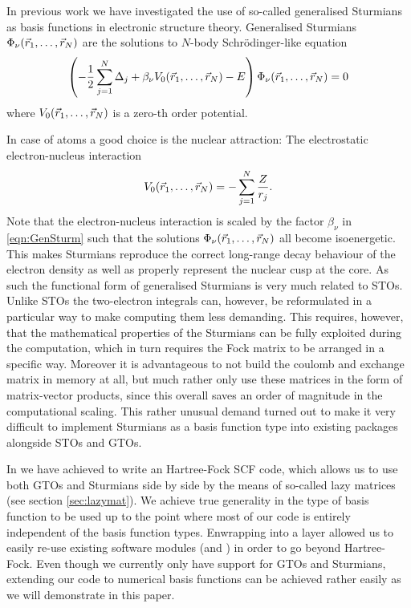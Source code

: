 
In previous work we have investigated the use of so-called generalised Sturmians as basis functions
in electronic structure theory.
%
Generalised Sturmians $\Phi_\nu(\vec{r}_1, \ldots, \vec{r}_N)$ are the solutions to $N$-body Schrödinger-like equation
\begin{equation}
	\left( -\frac12 \sum_{j=1}^N \Delta_j + \beta_\nu V_0(\vec{r}_1, \ldots, \vec{r}_N) - E \right) \Phi_\nu(\vec{r}_1, \ldots, \vec{r}_N) = 0
	\label{eqn:GenSturm}
\end{equation}
where $V_0(\vec{r}_1, \ldots, \vec{r}_N)$ is
a zero-th order potential.

In case of atoms a good choice is the nuclear attraction:
The electrostatic electron-nucleus interaction
\[
	V_0(\vec{r}_1, \ldots, \vec{r}_N) = - \sum_{j=1}^N \frac{Z}{r_j}.
\]
Note that the electron-nucleus interaction is scaled by the factor $\beta_\nu$ in \eqref{eqn:GenSturm}
such that the solutions $\Phi_\nu(\vec{r}_1, \ldots, \vec{r}_N)$ all become isoenergetic.
This makes Sturmians reproduce the correct long-range decay behaviour of the electron density
as well as properly represent the nuclear cusp at the core.
As such the functional form of generalised Sturmians is very much related to STOs.
Unlike STOs the two-electron integrals can, however, be reformulated in a particular way
to make computing them less demanding.
This requires, however, that the mathematical properties of the Sturmians
can be fully exploited during the computation,
which in turn requires the Fock matrix to be arranged in a specific way.
Moreover it is advantageous to not build the coulomb and exchange matrix in memory at all,
but much rather only use these matrices in the form of matrix-vector products,
since this overall saves an order of magnitude in the computational scaling.
%
%
This rather unusual demand turned out to make it very difficult to implement Sturmians
as a basis function type into existing packages alongside STOs and GTOs.

In \molsturm we have achieved to write an Hartree-Fock SCF code,
which allows us to use both GTOs and Sturmians side by side by the means
of so-called lazy matrices (see section \ref{sec:lazymat}).
We achieve true generality in the type of basis function to be used
up to the point where most of our code is entirely
independent of the basis function types.
Enwrapping \molsturm into a \python layer allowed us to easily re-use existing
software modules (\adcman and \pyscf) in order to go beyond Hartree-Fock.
Even though we currently only have support for GTOs and Sturmians,
extending our code to numerical basis functions can be achieved rather easily
as we will demonstrate in this paper.

